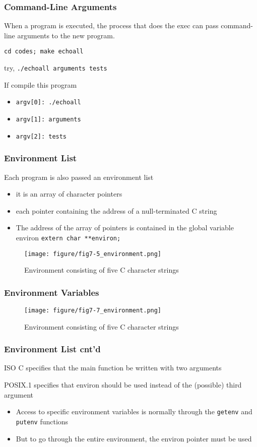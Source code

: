 \documentclass[newPxFont,sthlmFooter,nooffset]{beamer}
\begin{document}
\begin{frame}
  \frametitle{Command-Line Arguments}
When a program is executed, the process that does the exec can pass command-line arguments to the new program.

\texttt{cd codes; make echoall}



try,
\texttt{./echoall arguments tests}

If compile this program
\begin{itemize}
\item \texttt{argv[0]: ./echoall}
\item \texttt{argv[1]: arguments}
\item \texttt{argv[2]: tests}
\end{itemize}
\end{frame}

\begin{frame}[t]
  \frametitle{Environment List}
Each program is also passed an environment list
\begin{itemize}
\item it is an array of character pointers
\item each pointer containing the address of a null-terminated C
  string
\item The address of the array of pointers is contained in the global variable environ \texttt{extern char **environ;}
\end{itemize}

\begin{figure}[h]
  \centering
  \texttt{[image: figure/fig7-5\_environment.png]}
  \caption{Environment consisting of five C character strings}
\end{figure}
\end{frame}

\begin{frame}[t]
  \frametitle{Environment Variables}
\begin{figure}[h]
  \centering
  \texttt{[image: figure/fig7-7\_environment.png]}
  \caption{Environment consisting of five C character strings}
\end{figure}
\end{frame}

\begin{frame}[t]
  \frametitle{Environment List cnt'd}
ISO C specifies that the main function be written with two arguments

POSIX.1 specifies that environ should be used instead of the (possible) third argument
\begin{itemize}
\item Access to specific environment variables is normally through the
  \texttt{getenv} and \texttt{putenv} functions
\item But to go through the entire environment, the environ pointer must be used
\end{itemize}

\end{frame}
\end{document}
